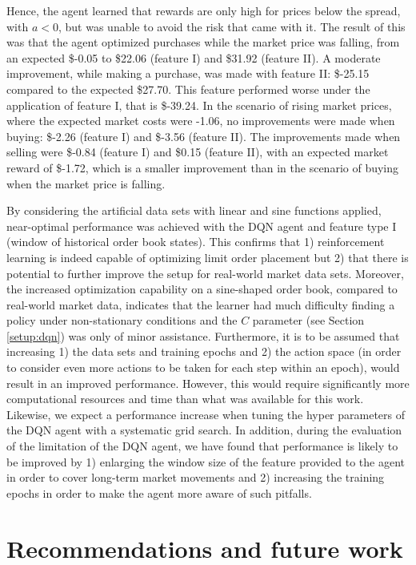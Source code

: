     Hence, the agent learned that rewards are only high for prices below the spread, with $a<0$, but was unable to avoid the risk that came with it.
    The result of this was that the agent optimized purchases while the market price was falling, from an expected \$-0.05 to \$22.06 (feature I) and \$31.92 (feature II).
    A moderate improvement, while making a purchase, was made with feature II: \$-25.15 compared to the expected \$27.70. This feature performed worse under the application of feature I, that is \$-39.24.
    In the scenario of rising market prices, where the expected market costs were -1.06, no improvements were made when buying: \$-2.26 (feature I) and \$-3.56 (feature II).
    The improvements made when selling were \$-0.84 (feature I) and \$0.15 (feature II), with an expected market reward of \$-1.72, which is a smaller improvement than in the scenario of buying when the market price is falling.
    
    By considering the artificial data sets with linear and sine functions applied, near-optimal performance was achieved with the DQN agent and feature type I (window of historical order book states).
    This confirms that 1) reinforcement learning is indeed capable of optimizing limit order placement but 2) that there is potential to further improve the setup for real-world market data sets.
    Moreover, the increased optimization capability on a sine-shaped order book, compared to real-world market data, indicates that the learner had much difficulty finding a policy under non-stationary conditions and the $C$ parameter (see Section \ref{setup:dqn}) was only of minor assistance.
    Furthermore, it is to be assumed that increasing 1) the data sets and training epochs and 2) the action space (in order to consider even more actions to be taken for each step within an epoch), would result in an improved performance.
    However, this would require significantly more computational resources and time than what was available for this work.
    Likewise, we expect a performance increase when tuning the hyper parameters of the DQN agent with a systematic grid search.
    In addition, during the evaluation of the limitation of the DQN agent, we have found that performance is likely to be improved by 1) enlarging the window size of the feature provided to the agent in order to cover long-term market movements and 2) increasing the training epochs in order to make the agent more aware of such pitfalls.

\section{Recommendations and future work}

